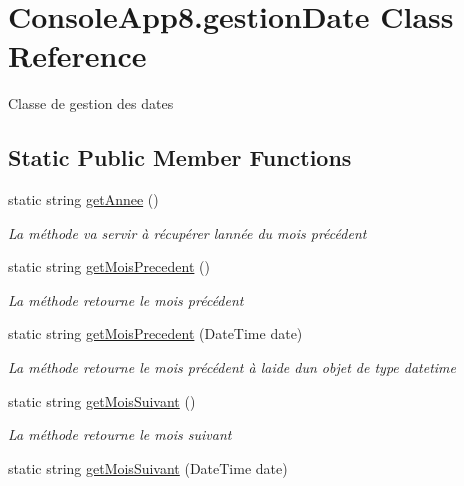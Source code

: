 \hypertarget{class_console_app8_1_1gestion_date}{}\section{Console\+App8.\+gestion\+Date Class Reference}
\label{class_console_app8_1_1gestion_date}


Classe de gestion des dates  


\subsection*{Static Public Member Functions}
\begin{DoxyCompactItemize}
\item 
static string \mbox{\hyperlink{class_console_app8_1_1gestion_date_a097cf6421da4142a08f5b9e819336252}{get\+Annee}} ()
\begin{DoxyCompactList}\small\item\em La méthode va servir à récupérer l\textquotesingle{}année du mois précédent \end{DoxyCompactList}\item 
static string \mbox{\hyperlink{class_console_app8_1_1gestion_date_a14b8ffa61a02c9402717af5a4527d586}{get\+Mois\+Precedent}} ()
\begin{DoxyCompactList}\small\item\em La méthode retourne le mois précédent \end{DoxyCompactList}\item 
static string \mbox{\hyperlink{class_console_app8_1_1gestion_date_a5aca6ea8abeee381e9ec5509e4e0459a}{get\+Mois\+Precedent}} (Date\+Time date)
\begin{DoxyCompactList}\small\item\em La méthode retourne le mois précédent à l\textquotesingle{}aide d\textquotesingle{}un objet de type datetime \end{DoxyCompactList}\item 
static string \mbox{\hyperlink{class_console_app8_1_1gestion_date_a24f475093dcb36eecbe639a9484066f8}{get\+Mois\+Suivant}} ()
\begin{DoxyCompactList}\small\item\em La méthode retourne le mois suivant \end{DoxyCompactList}\item 
static string \mbox{\hyperlink{class_console_app8_1_1gestion_date_ae0f7f304fd9f44857f69b6c7fc03ef41}{get\+Mois\+Suivant}} (Date\+Time date)

\end{DoxyCompactItemize}
